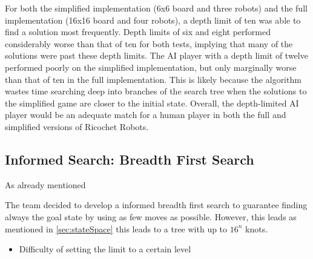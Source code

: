 \documentclass[a4paper,10pt]{article}
\begin{document}
  For both the simplified implementation (6x6 board and three robots) and the full implementation (16x16 board and four robots), a depth limit of ten was able to
  find a solution most frequently.  Depth limits of six and eight performed considerably worse than that of ten for both tests, implying that many of the solutions were
  past these depth limits.  The AI player with a depth limit of twelve performed poorly on the simplified implementation, but only marginally worse than that of ten in
  the full implementation.  This is likely because the algorithm wastes time searching deep into branches of the search tree when the solutions to the simplified game
  are closer to the initial state.  Overall, the depth-limited AI player would be an adequate match for a human player in both the full and simplified versions of
  Ricochet Robots.\\


  \subsection{Informed Search: Breadth First Search}
  As already mentioned

  The team decided to develop a informed breadth first search to guarantee finding always the goal state by using as few moves as possible. However, this leads as mentioned in \ref{sec:stateSpace} this leads to a tree with up to $16^n$ knots.
  \begin{itemize}
    \item Difficulty of setting the limit to a certain level
  \end{itemize}
\end{document}
